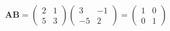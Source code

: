 \begin{equation*}
	\bm{AB}=\begin{pmatrix}2&1\\5&3\end{pmatrix}\begin{pmatrix}3&-1\\-5&2\end{pmatrix}=\begin{pmatrix}1&0\\0&1\end{pmatrix}
\end{equation*}
